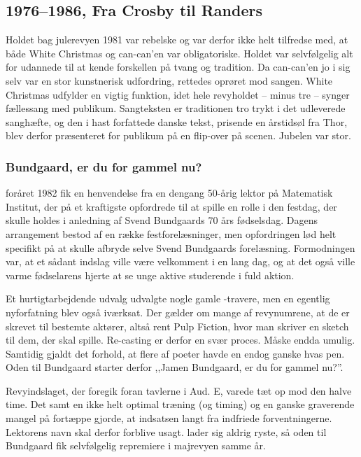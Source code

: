\vspace{-18pt}
\subsection{1976--1986, Fra Crosby til Randers}

Holdet bag julerevyen 1981 var rebelske og var derfor ikke helt tilfredse med, at både White Christmas og can-can'en var obligatoriske. Holdet var selvfølgelig alt for udannede til at kende forskellen på tvang og tradition. Da can-can'en jo i sig selv var en stor kunstnerisk udfordring, rettedes oprøret mod sangen. White Christmas udfylder en vigtig funktion, idet hele revyholdet -- minus tre -- synger fællessang med publikum. Sangteksten er traditionen tro trykt i det udleverede sanghæfte, og den i hast forfattede danske tekst, prisende en årstidsøl fra Thor, blev derfor præsenteret for publikum på en flip-over på scenen. Jubelen var stor.

\subsubsection{Bundgaard, er du for gammel nu?}

foråret 1982 fik \TKET en henvendelse fra en dengang 50-årig lektor på Matematisk Institut, der på et kraftigste opfordrede \TKET til at spille en rolle i den festdag, der skulle holdes i anledning af Svend Bundgaards 70 års fødselsdag. Dagens arrangement bestod af en række festforelæsninger, men opfordringen lød helt specifikt på at \TKET skulle afbryde selve Svend Bundgaards forelæsning. Formodningen var, at et sådant indslag ville være velkomment i en lang dag, og at det også ville varme fødselarens hjerte at se unge aktive studerende i fuld aktion.

Et hurtigtarbejdende udvalg udvalgte nogle gamle \TK{}-travere, men en egentlig nyforfatning blev også iværksat. Der gælder om mange af revynumrene, at de er skrevet til bestemte aktører, altså rent Pulp Fiction, hvor man skriver en sketch til dem, der skal spille. Re-casting er derfor en svær proces. Måske endda umulig. Samtidig gjaldt det forhold, at flere af \TKETs poeter havde en endog ganske hvas pen. Oden til Bundgaard starter derfor ,,Jamen Bundgaard, er du for gammel nu?''.

Revyindslaget, der foregik foran tavlerne i Aud. E, varede tæt op mod den halve time. Det samt en ikke helt optimal træning (og timing) og en ganske graverende mangel på fortæppe gjorde, at indsatsen langt fra indfriede forventningerne. Lektorens navn skal derfor forblive usagt. \TKET lader sig aldrig ryste, så oden til Bundgaard fik selvfølgelig repremiere i majrevyen samme år.


